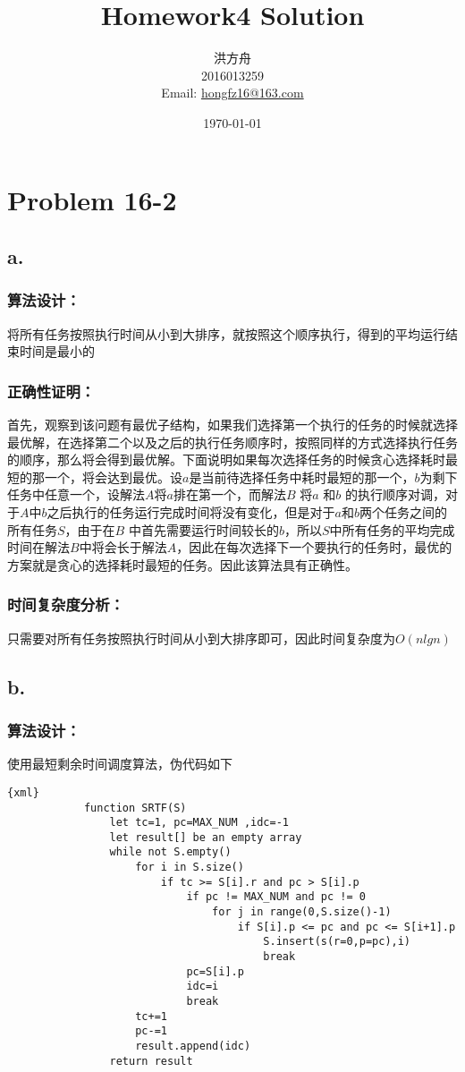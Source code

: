 \documentclass[12pt]{article}
\title{Homework4 Solution}
\author{洪方舟\\2016013259\\Email: \href{mailto:hongfz16@163.com}{hongfz16@163.com}}
\date{\today}
\begin{document}
  \maketitle
  \section*{Problem 16-2}
    \subsection*{a.}
        \subsubsection*{算法设计：}
            将所有任务按照执行时间从小到大排序，就按照这个顺序执行，得到的平均运行结束时间是最小的
        \subsubsection*{正确性证明：}
            首先，观察到该问题有最优子结构，如果我们选择第一个执行的任务的时候就选择最优解，在选择第二个以及之后的执行任务顺序时，按照同样的方式选择执行任务的顺序，那么将会得到最优解。下面说明如果每次选择任务的时候贪心选择耗时最短的那一个，将会达到最优。设$a$是当前待选择任务中耗时最短的那一个，$b$为剩下任务中任意一个，设解法$A$将$a$排在第一个，而解法$B$ 将$a$ 和$b$ 的执行顺序对调，对于$A$中$b$之后执行的任务运行完成时间将没有变化，但是对于$a$和$b$两个任务之间的所有任务$S$，由于在$B$ 中首先需要运行时间较长的$b$，所以$S$中所有任务的平均完成时间在解法$B$中将会长于解法$A$，因此在每次选择下一个要执行的任务时，最优的方案就是贪心的选择耗时最短的任务。因此该算法具有正确性。
        \subsubsection*{时间复杂度分析：}
            只需要对所有任务按照执行时间从小到大排序即可，因此时间复杂度为$O(nlgn)$
    \subsection*{b.}
        \subsubsection*{算法设计：}
            使用最短剩余时间调度算法，伪代码如下
            \begin{lstlisting}{xml}
            function SRTF(S)
                let tc=1, pc=MAX_NUM ,idc=-1
                let result[] be an empty array
                while not S.empty()
                    for i in S.size()
                        if tc >= S[i].r and pc > S[i].p
                            if pc != MAX_NUM and pc != 0
                                for j in range(0,S.size()-1)
                                    if S[i].p <= pc and pc <= S[i+1].p
                                        S.insert(s(r=0,p=pc),i)
                                        break
                            pc=S[i].p
                            idc=i
                            break
                    tc+=1
                    pc-=1
                    result.append(idc)
                return result
            \end{lstlisting}
\end{document}
